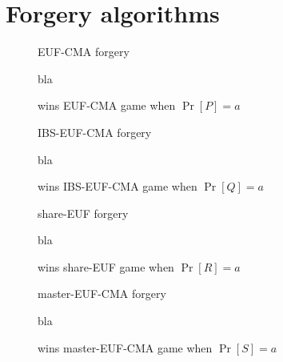 \section{Forgery algorithms}
  \begin{figure}[H]
    \begin{algobox}{\textsf{EUF-CMA} forgery}
      \begin{algorithmic}[1]
        \State bla
      \end{algorithmic}
    \end{algobox}
    \caption{wins \textsf{EUF-CMA} game when $\Pr[P] = a$}
    \label{alg:forge:ds}
  \end{figure}

  \begin{figure}[H]
    \begin{algobox}{\textsf{IBS-EUF-CMA} forgery}
      \begin{algorithmic}[1]
        \State bla
      \end{algorithmic}
    \end{algobox}
    \caption{wins \textsf{IBS-EUF-CMA} game when $\Pr[Q] = a$}
    \label{alg:forge:ibs}
  \end{figure}

  \begin{figure}[H]
    \begin{algobox}{\textsf{share-EUF} forgery}
      \begin{algorithmic}[1]
        \State bla
      \end{algorithmic}
    \end{algobox}
    \caption{wins \textsf{share-EUF} game when $\Pr[R] = a$}
    \label{alg:forge:share}
  \end{figure}

  \begin{figure}[H]
    \begin{algobox}{\textsf{master-EUF-CMA} forgery}
      \begin{algorithmic}[1]
        \State bla
      \end{algorithmic}
    \end{algobox}
    \caption{wins \textsf{master-EUF-CMA} game when $\Pr[S] = a$}
    \label{alg:forge:master}
  \end{figure}
